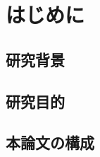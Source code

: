 \section{はじめに}
\label{sec:1}
\subsection{研究背景}
\label{sec:1-1}
\subsection{研究目的}
\label{sec:1-2}
\subsection{本論文の構成}
\label{sec:1-3}
